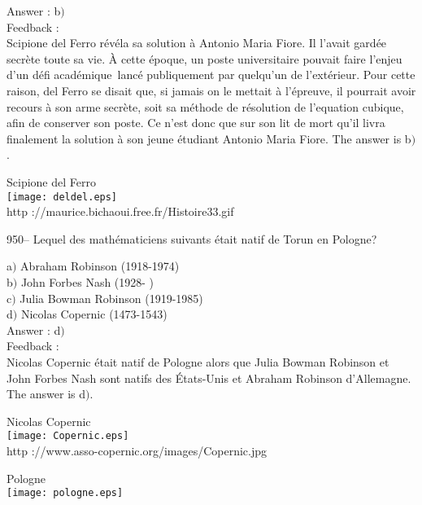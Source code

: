 ﻿\documentclass[letterpaper, 12pt]{article}
\begin{document}
Answer : b$)$\\

Feedback : \\
Scipione del Ferro r\'ev\'ela sa solution \`a Antonio Maria Fiore.
Il l'avait gard\'ee secr\`ete toute sa vie. \`A cette \'epoque, un
poste universitaire pouvait faire l'enjeu d'un \og d\'efi
acad\'emique\fg\ lanc\'e publiquement par quelqu'un de
l'ext\'erieur. Pour cette raison, del Ferro se disait que, si jamais
on le mettait \`a l'\'epreuve, il pourrait avoir recours \`a son
arme secr\`ete, soit sa m\'ethode de r\'esolution de l'equation
cubique, afin de conserver son poste. Ce n'est donc que sur son lit
de mort qu'il livra finalement la solution \`a son jeune
\'etudiant Antonio Maria Fiore. The answer is b$)$.\\

        \begin{center}
        Scipione del Ferro\\
    \texttt{[image: deldel.eps]}\\
        {\footnotesize http ://maurice.bichaoui.free.fr/Histoire33.gif}
    \end{center}

950-- Lequel des math\'ematiciens suivants \'etait natif de Torun en
Pologne?

a$)$ Abraham Robinson (1918-1974) \\
b$)$ John Forbes Nash (1928- ) \\
c$)$ Julia Bowman Robinson (1919-1985) \\
d$)$ Nicolas Copernic (1473-1543) \\

Answer : d$)$\\

Feedback : \\
Nicolas Copernic \'etait natif de Pologne alors que Julia Bowman
Robinson et John Forbes Nash sont natifs des \'Etats-Unis
et Abraham Robinson d'Allemagne. The answer is d$)$.\\

        \begin{center}
        Nicolas Copernic\\
    \texttt{[image: Copernic.eps]}\\
        {\footnotesize http ://www.asso-copernic.org/images/Copernic.jpg}
    \end{center}

        \begin{center}
        Pologne\\
    \texttt{[image: pologne.eps]}\\
    \end{center}
\end{document}
